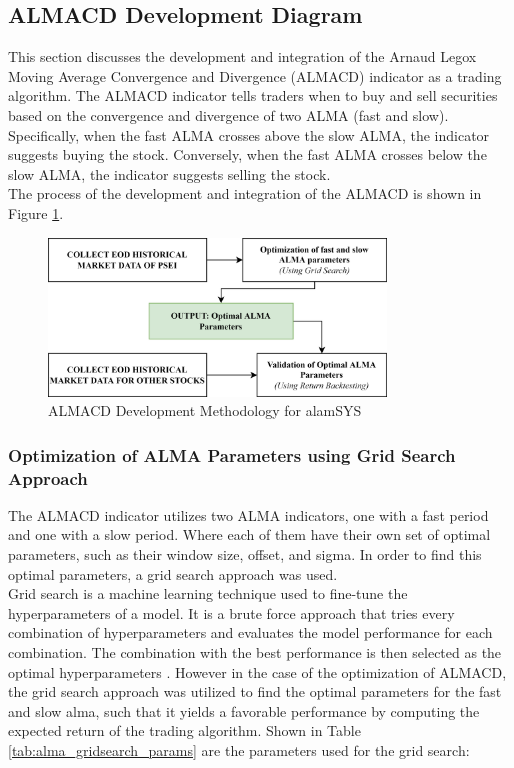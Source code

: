 \subsection{ALMACD Development Diagram}
\label{subsec:almacd_diagram}
This section discusses the development and integration of the
Arnaud Legox Moving Average Convergence and Divergence (ALMACD)
indicator as a trading algorithm. The ALMACD indicator tells
traders when to buy and sell securities based on the convergence
and divergence of two ALMA (fast and slow). Specifically, when
the fast ALMA crosses above the slow ALMA, the indicator suggests
buying the stock. Conversely, when the fast ALMA crosses below
the slow ALMA, the indicator suggests selling the stock.
\hfill \\

The process of the development and integration of the ALMACD
is shown in Figure \ref{fig:almacd_diagram}.

\begin{figure}[ht]
    \centering
    \includegraphics[width=0.80\textwidth]{./assets/Chapter_3/alamcd.png}
    \caption{ALMACD Development Methodology for alamSYS}
    \label{fig:almacd_diagram}
\end{figure}
\FloatBarrier

\subsubsection{Optimization of ALMA Parameters using Grid Search Approach}
\label{subsubsec:almacd_gridsearch}
The ALMACD indicator utilizes two ALMA indicators, one with a fast
period and one with a slow period. Where each of them have their own
set of optimal parameters, such as their window size, offset, and sigma.
In order to find this optimal parameters, a grid search approach was
used.
\hfill \\

Grid search is a machine learning technique used to fine-tune the
hyperparameters of a model. It is a brute force approach that tries
every combination of hyperparameters and evaluates the model performance
for each combination. The combination with the best performance is
then selected as the optimal hyperparameters \cite{Joseph2018}.
However in the case of the optimization of ALMACD, the grid search
approach was utilized to find the optimal parameters for the 
fast and slow alma, such that it yields a favorable performance
by computing the expected return of the trading algorithm. Shown in Table
\ref{tab:alma_gridsearch_params} are the parameters used for the grid search:

